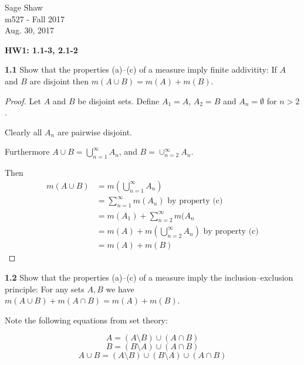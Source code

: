 \documentclass[12pt]{article}
\begin{document}
	\thispagestyle{empty}
	
	\begin{flushright}
		Sage Shaw \\
		m527 - Fall 2017 \\
		Aug. 30, 2017
	\end{flushright}
	
	{\large \textbf{HW1: 1.1-3, 2.1-2}}\bigbreak

	\hspace{-4 ex}\textbf{1.1} Show that the properties (a)--(c) of a measure imply finite addivitity: If $A$ and $B$ are disjoint then $m(A\cup B)=m(A)+m(B)$.
	
	
	\begin{proof}
		 Let $A$ and $B$ be disjoint sets. Define $A_{1}=A$, $A_{2}=B$ and $A_{n}=\emptyset$ for $n>2$.
	
	Clearly all $A_{n}$ are pairwise disjoint.
	
	Furthermore $A \cup B = \bigcup_{n=1}^{\infty}A_{n}$, and $B = \cup_{n=2}^{\infty}A_{n}$.
	
	Then
	\begin{equation*}
	\begin{split}
	m(A \cup B) & = m(\bigcup\limits_{n=1}^{\infty}A_{n}) \\
	& = \sum_{n=1}^{\infty}m(A_{n}) \text{ by property (c)} \\
	& = m(A_{1}) + \sum_{n=2}^{\infty}m(A_{n} \\
	& = m(A) + m(\bigcup\limits_{n=2}^{\infty}A_{n}) \text{ by property (c)} \\
	& = m(A) + m(B)
	\end{split}
	\end{equation*}
	
	\end{proof}

\bigbreak
\bigbreak



	\hspace{-4 ex}\textbf{1.2} Show that the properties (a)--(c) of a measure imply the inclusion--exclusion principle: For any sets $A,B$ we have $m(A\cup B)+m(A\cap B)=m(A)+m(B)$.
	
	Note the following equations from set theory:
	
	\begin{equation}
	A = (A \setminus B) \cup (A \cap B)
	\end{equation}
	\begin{equation}
	B = (B \setminus A) \cup (A \cap B)
	\end{equation}
	\begin{equation}
	A \cup B = (A \setminus B) \cup (B \setminus A) \cup (A \cap B)
	\end{equation}
	
\end{document}
